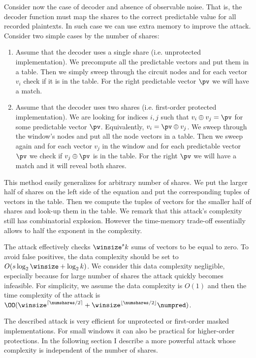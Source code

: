 Consider now the case of \txor{} decoder and absence of observable noise. That is, the decoder function must map the shares to the correct predictable value for all recorded plaintexts. In such case we can use extra memory to improve the attack. Consider two simple cases by the number of shares:
\begin{enumerate}
    \item Assume that the decoder uses a single share (i.e. unprotected implementation). We precompute all the predictable vectors and put them in a table. Then we simply sweep through the circuit nodes and for each vector $v_i$ check if it is in the table. For the right predictable vector $\pv$ we will have a match.
    
    \item Assume that the decoder uses two shares (i.e. first-order protected implementation). We are looking for indices $i,j$ such that $v_i \oplus v_j = \pv$ for some predictable vector $\pv$. Equivalently, $v_i = \pv \oplus v_j$. We sweep through the window's nodes and put all the node vectors in a table. Then we sweep again and for each vector $v_j$ in the window and for each predictable vector $\pv$ we check if $v_j \oplus \pv$ is in the table. For the right $\pv$ we will have a match and it will reveal both shares.
\end{enumerate}

This method easily generalizes for arbitrary number of shares. We put the larger half of shares on the left side of the equation and put the corresponding tuples of vectors in the table. Then we compute the tuples of vectors for the smaller half of shares and look-up them in the table. We remark that this attack's complexity still has combinatorial explosion. However the time-memory trade-off essentially allows to half the exponent in the complexity.

The attack effectively checks $\winsize^sk$ sums of vectors to be equal to zero. To avoid false positives, the data complexity should be set to $O(s\log_2{\winsize} + \log_2{k})$.
We consider this data complexity negligible, especially because for large number of shares the attack quickly becomes infeasible.
For simplicity, we assume the data complexity is $O(1)$ and then the time complexity of the attack is $\OO(\winsize^{\lceil \numshares/2 \rceil} + \winsize^{\lfloor \numshares/2 \rfloor} \numpred)$.

The described attack is very efficient for unprotected or first-order masked implementations. 
For small windows it can also be practical for higher-order protections. In the following section I describe a more powerful attack whose complexity is independent of the number of shares.